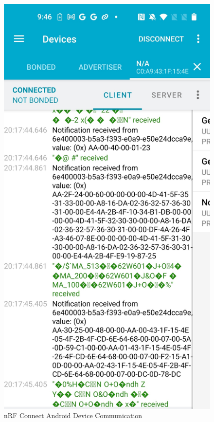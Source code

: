 \begin{figure}[H]
	\centering
	\includegraphics[scale=.145]{nrf_connect_android}
	\caption{nRF Connect Android Device Communication}
	\label{fig:nrfconnectandroid}
\end{figure}

